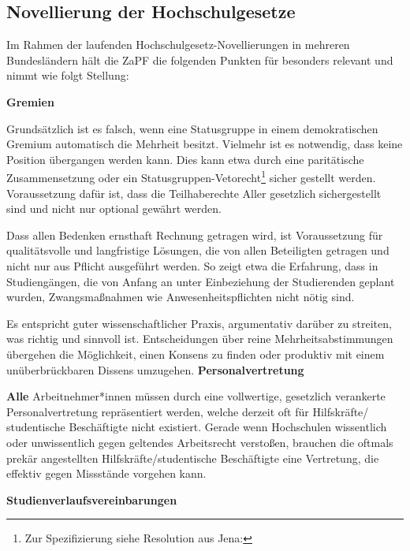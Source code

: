 
\subsection*{Novellierung der Hochschulgesetze}

Im Rahmen der laufenden Hochschulgesetz-Novellierungen in mehreren Bundesländern hält die ZaPF die folgenden Punkten für besonders relevant und nimmt wie folgt Stellung:

\textbf{Gremien}

Grundsätzlich ist es falsch, wenn eine Statusgruppe in einem demokratischen Gremium automatisch die Mehrheit besitzt. Vielmehr ist es notwendig, dass keine Position übergangen werden kann. Dies kann etwa durch eine paritätische Zusammensetzung oder ein Statusgruppen-Vetorecht\footnote{Zur Spezifizierung siehe Resolution aus Jena: } %
sicher gestellt werden. Voraussetzung dafür ist, dass die Teilhaberechte Aller gesetzlich sichergestellt sind und nicht nur optional gewährt werden.

Dass allen Bedenken ernsthaft Rechnung getragen wird, ist Voraussetzung für qualitätsvolle und langfristige Lösungen, die von allen Beteiligten getragen und nicht nur aus Pflicht ausgeführt werden. So zeigt etwa die Erfahrung, dass in Studiengängen, die von Anfang an unter Einbeziehung der Studierenden geplant wurden, Zwangsmaßnahmen wie Anwesenheitspflichten nicht nötig sind.

Es entspricht guter wissenschaftlicher Praxis, argumentativ darüber zu streiten, was richtig und sinnvoll ist. Entscheidungen über reine Mehrheitsabstimmungen übergehen die Möglichkeit, einen Konsens zu finden oder produktiv mit einem unüberbrückbaren Dissens umzugehen.
\newpage
\textbf{Personalvertretung}

\textbf{Alle} Arbeitnehmer*innen müssen durch eine vollwertige, gesetzlich verankerte Personalvertretung repräsentiert werden, welche derzeit oft für Hilfskräfte/ studentische Beschäftigte nicht existiert. Gerade wenn Hochschulen wissentlich oder unwissentlich gegen geltendes Arbeitsrecht verstoßen, brauchen die oftmals prekär angestellten Hilfskräfte/studentische Beschäftigte eine Vertretung, die effektiv gegen Missstände vorgehen kann.

\textbf{Studienverlaufsvereinbarungen}

